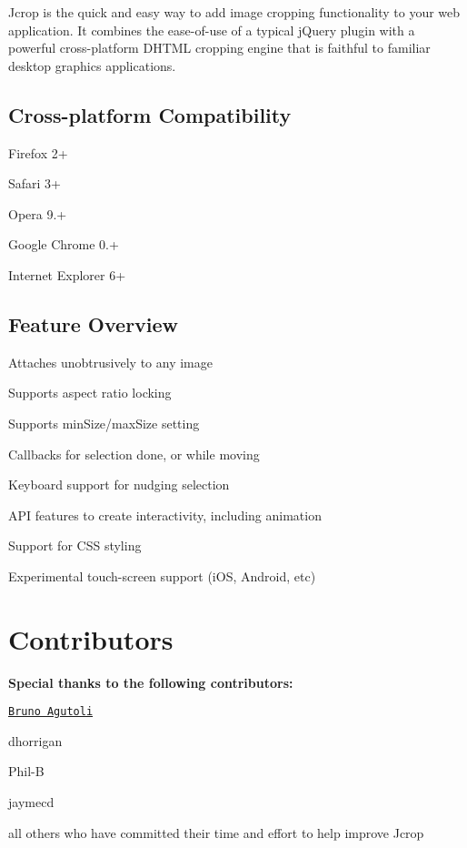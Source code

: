 Jcrop is the quick and easy way to add image cropping functionality to your web application. It combines the ease-\/of-\/use of a typical j\+Query plugin with a powerful cross-\/platform D\+H\+T\+ML cropping engine that is faithful to familiar desktop graphics applications.

\subsection*{Cross-\/platform Compatibility }


\begin{DoxyItemize}
\item Firefox 2+
\item Safari 3+
\item Opera 9.+
\item Google Chrome 0.+
\item Internet Explorer 6+
\end{DoxyItemize}

\subsection*{Feature Overview }


\begin{DoxyItemize}
\item Attaches unobtrusively to any image
\item Supports aspect ratio locking
\item Supports min\+Size/max\+Size setting
\item Callbacks for selection done, or while moving
\item Keyboard support for nudging selection
\item A\+PI features to create interactivity, including animation
\item Support for C\+SS styling
\item Experimental touch-\/screen support (i\+OS, Android, etc)
\end{DoxyItemize}

\section*{Contributors }

{\bfseries Special thanks to the following contributors\+:}


\begin{DoxyItemize}
\item \href{mailto:brunotla1@gmail.com}{\tt Bruno Agutoli}
\item dhorrigan
\item Phil-\/B
\item jaymecd
\item all others who have committed their time and effort to help improve Jcrop
\end{DoxyItemize}

